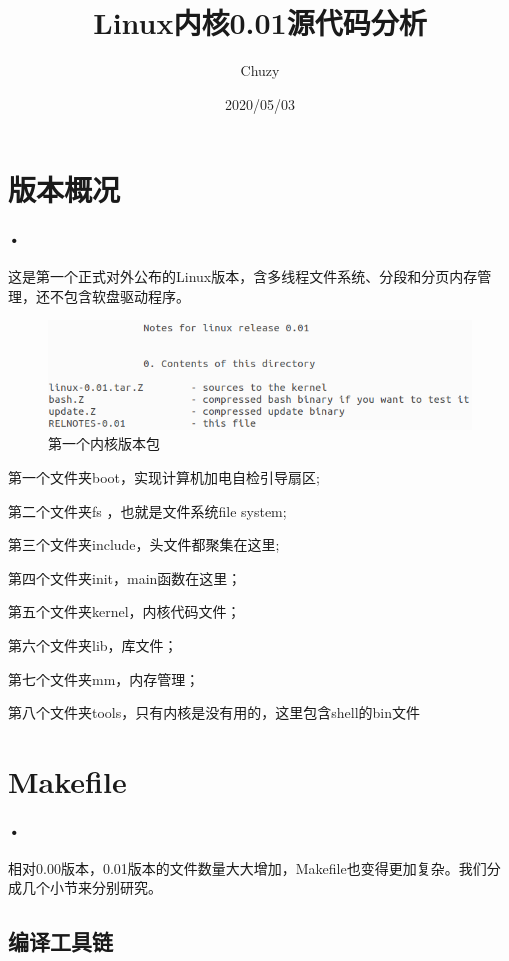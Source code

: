 \documentclass[12pt]{article}
\title{Linux内核0.01源代码分析}
\author{Chuzy}
\date{2020/05/03}
\begin{document}
\maketitle
\tableofcontents
\newpage 

\section{版本概况}
\paragraph{•}
这是第一个正式对外公布的Linux版本，含多线程文件系统、分段和分页内存管理，还不包含软盘驱动程序。
\begin{figure}[htbp]
\centering
\includegraphics[scale=0.5]{fig/1.png}
\caption{第一个内核版本包}
\label{fig:Content of Linux 0.01}
\end{figure}
\begin{list}{•}{•}
\item 第一个文件夹boot，实现计算机加电自检引导扇区;
\item 第二个文件夹fs ，也就是文件系统file system;
\item 第三个文件夹include，头文件都聚集在这里;
\item 第四个文件夹init，main函数在这里；
\item 第五个文件夹kernel，内核代码文件；
\item 第六个文件夹lib，库文件；
\item 第七个文件夹mm，内存管理；
\item 第八个文件夹tools，只有内核是没有用的，这里包含shell的bin文件
\end{list}
\section{Makefile}
\paragraph{•}
相对0.00版本，0.01版本的文件数量大大增加，Makefile也变得更加复杂。我们分成几个小节来分别研究。
\subsection{编译工具链}
\end{document}
